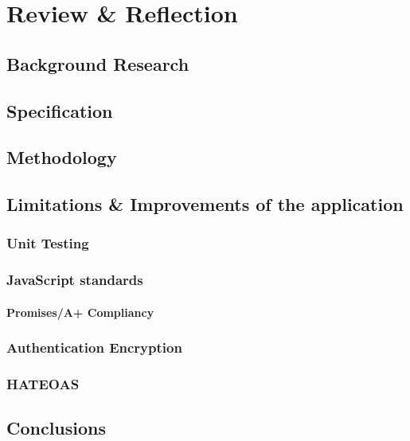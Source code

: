 \documentclass[]{report}
\begin{document}
	\chapter{Review \& Reflection}	
		\section{Background Research}
		\section{Specification}
		\section{Methodology}
		\section{Limitations \& Improvements of the application}
			\subsection{Unit Testing}
			\subsection{JavaScript standards}
				\subsubsection{Promises/A+ Compliancy}
			\subsection{Authentication Encryption}
			\subsection{HATEOAS}
		\section{Conclusions}
\end{document}
